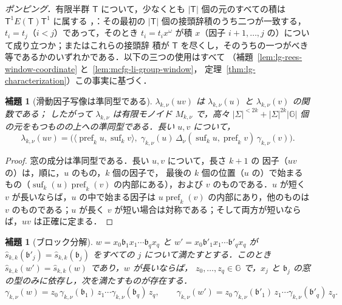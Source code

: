 \documentclass[11pt,a4paper]{ltjsarticle}
\numberwithin{equation}{section}
\theoremstyle{plain}
\newtheorem{lemma}[theorem]{補題}
\theoremstyle{definition}
\theoremstyle{remark}
\theoremstyle{plain}
\begin{document}
\emph{ポンピング．}有限半群 $\mathsf T$ について，少なくとも
$|\mathsf T|$ 個の元のすべての積は $\mathsf T^1E(\mathsf T)\mathsf T^1$ に属する
\cite[Lemma~2.2]{AlmeidaEtAl2009}，\cite{Pin1986}：その最初の
$|\mathsf T|$ 個の接頭辞積のうち二つが一致する，$t_i=t_j$（$i<j$）であって，そのとき
$t_i=t_ix^\omega$ が積 $x$（因子 $i+1,\ldots,j$ の）について成り立つか；またはこれらの接頭辞
積が $\mathsf T$ を尽くし，そのうちの一つがべき等であるかのいずれかである．以下の三つの使用はすべて
（補題~\ref{lem:lg-rees-window-coordinate} と~\ref{lem:mcfg-li-group-window}，
定理~\ref{thm:lg-characterization}）この事実に基づく．

\begin{lemma}[滑動因子写像は準同型である]
\label{lem:local-group-morphism}
$\lambda_{k,\nu}(uv)$ は $\lambda_{k,\nu}(u)$ と $\lambda_{k,\nu}(v)$ の関数である；
したがって $\lambda_{k,\nu}$ は有限モノイド $M_{k,\nu}$ で，高々
$|\Sigma|^{<2k}+|\Sigma|^{2k}|{\mathbb G}|$ 個の元をもつものの上への準同型である．長い $u,v$ について，
\[
 \lambda_{k,\nu}(uv)
 =\bigl(\langle\operatorname{pref}_ku,\operatorname{suf}_kv\rangle,\;
   \gamma_{k,\nu}(u)\,\Delta_\nu(\operatorname{suf}_ku,\operatorname{pref}_kv)\,
   \gamma_{k,\nu}(v)\bigr).
\]
\end{lemma}

\begin{proof}
窓の成分は準同型である．長い $u,v$ について，長さ $k+1$ の
因子（$uv$ の）は，順に，$u$ のもの，$k$ 個の因子で，
最後の $k$ 個の位置（$u$ の）で始まるもの（$\operatorname{suf}_k(u)\operatorname{pref}_k(v)$ の内部にある），および
$v$ のものである．$u$ が短く $v$ が長いならば，$u$ の中で始まる因子は
$u\operatorname{pref}_k(v)$ の内部にあり，他のものは $v$ のものである；$u$ が長く
$v$ が短い場合は対称である；そして両方が短いならば，$uv$ は正確に定まる．
\end{proof}

\begin{lemma}[ブロック分解]
\label{lem:local-group-blocks}
$w=x_0\mathfrak b_1x_1\cdots\mathfrak b_qx_q$ と $w'=x_0\mathfrak b'_1x_1\cdots\mathfrak b'_qx_q$ が
$\widehat s_{k,k}(\mathfrak b'_j)=\widehat s_{k,k}(\mathfrak b_j)$ をすべての $j$ について満たすとする．このとき
$\widehat s_{k,k}(w')=\widehat s_{k,k}(w)$ であり，$w$ が長いならば，
$z_0,\ldots,z_q\in {\mathbb G}$ で，$x_j$ と
$\mathfrak b_j$ の窓の型のみに依存し，次を満たすものが存在する．
\[
 \gamma_{k,\nu}(w)=z_0\,\gamma_{k,\nu}(\mathfrak b_1)\,z_1\cdots\gamma_{k,\nu}(\mathfrak b_q)\,z_q,
 \qquad
 \gamma_{k,\nu}(w')=z_0\,\gamma_{k,\nu}(\mathfrak b'_1)\,z_1\cdots\gamma_{k,\nu}(\mathfrak b'_q)\,z_q .
\]
\end{lemma}
\end{document}
